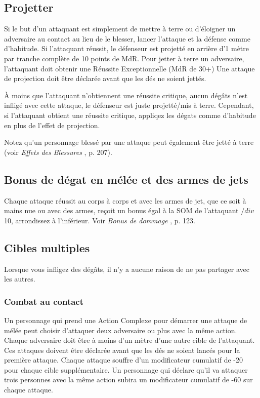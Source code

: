 \subsection{Projetter} \label{sec:knockdown-knockback} 

Si le but d'un attaquant est simplement de mettre à terre ou d'éloigner un adversaire au contact au lieu de le blesser, lancer l'attaque et la défense comme d'habitude. Si l'attaquant réussit, le défenseur est projetté en arrière d'1 mètre par tranche complète de 10 points de MdR. Pour jetter à terre un adversaire, l'attaquant doit obtenir une Réussite Exceptionnelle (MdR de 30+) Une attaque de projection doit être déclarée avant que les dés ne soient jettés. 

À moins que l'attaquant n'obtiennent une réussite critique, aucun dégâts n'est infligé avec cette attaque, le défenseur est juste projetté/mis à terre. Cependant, si l'attaquant obtient une réussite critique, appliqez les dégats comme d'habitude en plus de l'effet de projection. 

Notez qu'un personnage blessé par une attaque peut également être jetté à terre (voir \emph{Effets des Blessures }, p. 207). 



\subsection{Bonus de dégat en mélée et des armes de jets} \label{sec:melee-thrown-damage-bonus} 

Chaque attaque réussit au corps à corps et avec les armes de jet, que ce soit à mains nue ou avec des armes, reçoit un bonus égal à la SOM de l'attaquant $/div$ 10, arrondissez à l'inférieur. Voir \emph{Bonus de dommage }, p. 123. 



\subsection{Cibles multiples} \label{sec:multiple-targets} 

Lorsque vous infligez des dégâts, il n'y a aucune raison de ne pas partager avec les autres. 

\subsubsection{Combat au contact} 

Un personnage qui prend une Action Complexe pour démarrer une attaque de mélée peut choisir d'attaquer deux adversaire ou plus avec la même action. Chaque adversaire doit être à moins d'un mètre d'une autre cible de l'attaquant. Ces attaques doivent être déclarée avant que les dés ne soient lancés pour la première attaque. Chaque attaque souffre d'un modificateur cumulatif de -20 pour chaque cible supplémentaire. Un personnage qui déclare qu'il va attaquer trois personnes avec la même action subira un modificateur cumulatif de -60 sur chaque attaque. 

